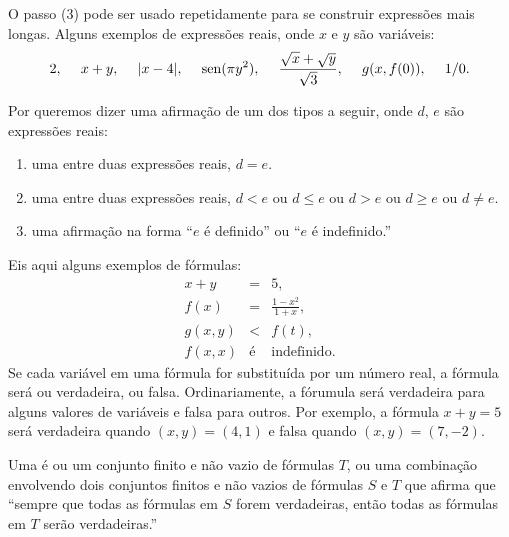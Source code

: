 \documentclass{svmono}
\begin{document}
O passo (3) pode ser usado repetidamente para se construir expressões
mais longas. Alguns exemplos de expressões reais, onde $x$ e $y$ são
variáveis:
\[
2, \hspace{3ex} x+y, \hspace{3ex} |x-4|, \hspace{3ex} \operatorname{sen}(\pi y^2),
\hspace{3ex} \frac{\sqrt{x} + \sqrt{y}}{\sqrt{3}}, \hspace{3ex} g(x,f(0)),
\hspace{3ex} 1/0.
\]

Por  queremos dizer uma afirmação de um dos tipos a seguir,
onde $d$, $e$ são expressões reais:
\begin{enumerate}[(1)]
\item uma  entre duas expressões reais, $d = e$.
\item uma  entre duas expressões reais, $d < e$ ou
      $d \le e$ ou $d > e$ ou $d \ge e$ ou $d \ne e$.
\item uma afirmação na forma ``$e$ é definido'' ou ``$e$ é indefinido.''
\end{enumerate}
Eis aqui alguns exemplos de fórmulas:
\begin{eqnarray*}
  x + y & = & 5, \\
  f(x)  & = & \frac{1 - x^2}{1 + x}, \\
 g(x,y) & < & f(t), \\
 f(x,x) & \text{é} & \text{indefinido}.
\end{eqnarray*}
Se cada variável em uma fórmula for substituída por um número real, a
fórmula será ou verdadeira, ou falsa. Ordinariamente, a fórumula será
verdadeira para alguns valores de variáveis e falsa para outros. Por
exemplo, a fórmula $x+y = 5$ será verdadeira quando $(x,y) = (4,1)$
e falsa quando $(x,y) = (7,-2)$.

\begin{defin}
Uma  é ou um conjunto finito e não vazio
de fórmulas $T$, ou uma combinação envolvendo dois conjuntos finitos e
não vazios de fórmulas $S$ e $T$ que afirma que ``sempre que todas as
fórmulas em $S$ forem verdadeiras, então todas as fórmulas em $T$ serão
verdadeiras.''
\end{defin}
\end{document}
